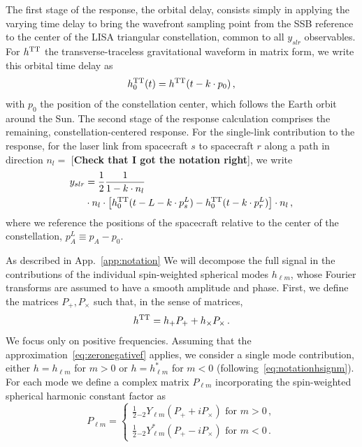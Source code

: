 \documentclass[aps,showpacs,twocolumn,
prd,superscriptaddress,nofootinbib]{revtex4-1}
\newcommand{\be}{\begin{equation}}
\newcommand{\ee}{\end{equation}}
\newcommand{\nn}{\nonumber}
\newcommand{\hatk}{k}
\newcommand{\jgb}[1]{{\color{DarkGreen} #1}}
\begin{document}
\jgb{The first stage of the response, the orbital delay, consists simply in applying the varying time delay to bring the wavefront sampling point from the SSB reference to the center} of the LISA triangular constellation, common to all $y_{slr}$ observables. For $h^{\rm TT}$ the transverse-traceless gravitational waveform in matrix form, we write this orbital time delay as
\be\label{eq:defresponse0}
	h_{0}^{\rm TT} (t) = h^{\rm TT}(t-\hatk\cdot p_{0}) \,,
\ee
with $p_{0}$ the position of the constellation center, which follows the Earth orbit around the Sun. The second \jgb{stage of the response calculation comprises the remaining, constellation-centered response. For the single-link contribution to the response, for the laser link from spacecraft $s$ to spacecraft $r$ along a path in direction $n_l=$ [{\bf Check that I got the notation right}], we write}
\begin{align}\label{eq:defresponseL}
	y_{slr} &= \frac{1}{2} \frac{1}{1 - \hatk\cdot n_{l}} \nn\\
	& \cdot n_{l}\cdot \left[ h_{0}^{\rm TT}(t - L - \hatk\cdot p^{L}_{s}) - h_{0}^{\rm TT}(t - \hatk\cdot p^{L}_{r}) \right] \cdot n_{l}\,,
\end{align}
where we reference the positions of the spacecraft relative to the center of the constellation, $p^{L}_{A} \equiv p_{A} - p_{0}$.

As described in App.~\ref{app:notation} We will decompose the full signal in the contributions of the individual spin-weighted spherical modes $h_{\ell m}$, whose Fourier transforms are assumed to have a smooth amplitude and phase. First, we define the matrices $P_{+},P_{\times}$ such that, in the sense of matrices,
\be
	h^{\rm TT} = h_{+}P_{+} + h_{\times}P_{\times} \,.
\ee
We focus only on positive frequencies. Assuming that the approximation~\eqref{eq:zeronegativef} applies, we consider a single mode contribution, either $h=h_{\ell m}$ for $m>0$ or $h=h_{\ell m}^{*}$ for $m<0$ (following~\eqref{eq:notationhsignm}). For each mode we define a complex matrix $P_{\ell m}$ incorporating the spin-weighted spherical harmonic constant factor as
\be
	P_{\ell m} = 
	\begin{cases} 
	\frac{1}{2} {}_{-2}Y_{\ell m} \left( P_{+} + i P_{\times} \right) \text{ for } m>0\,,\\
	\frac{1}{2} {}_{-2}Y_{\ell m}^{*} \left( P_{+} - i P_{\times} \right) \text{ for } m<0\,.
	\end{cases}
\ee
\end{document}
